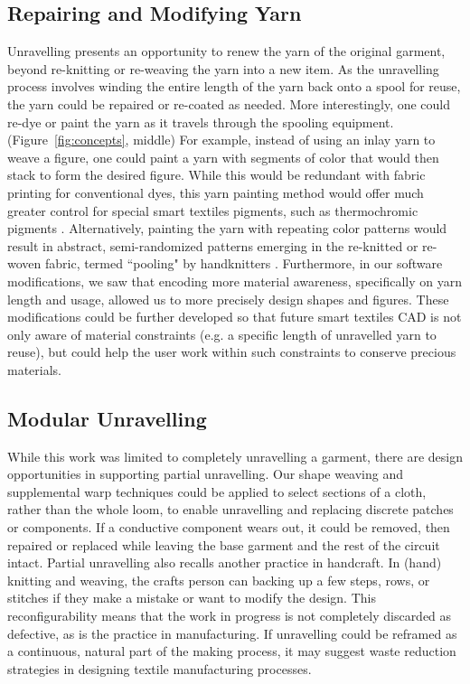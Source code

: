 \subsection{Repairing and Modifying Yarn}

Unravelling presents an opportunity to renew the yarn of the original garment, beyond re-knitting or re-weaving the yarn into a new item. As the unravelling process involves winding the entire length of the yarn back onto a spool for reuse, the yarn could be repaired or re-coated as needed. More interestingly, one could re-dye or paint the yarn as it travels through the spooling equipment. (Figure~\ref{fig:concepts}, middle) For example, instead of using an inlay yarn to weave a figure, one could paint a yarn with segments of color that would then stack to form the desired figure. While this would be redundant with fabric printing for conventional dyes, this yarn painting method would offer much greater control for special smart textiles pigments, such as thermochromic pigments \cite{devendorf_adapting_2019}. Alternatively, painting the yarn with repeating color patterns would result in abstract, semi-randomized patterns emerging in the re-knitted or re-woven fabric, termed ``pooling" by handknitters \cite{plannedpooling}. Furthermore, in our software modifications, we saw that encoding more material awareness, specifically on yarn length and usage, allowed us to more precisely design shapes and figures. These modifications could be further developed so that future smart textiles CAD is not only aware of material constraints (e.g. a specific length of unravelled yarn to reuse), but could help the user work within such constraints to conserve precious materials.


\subsection{Modular Unravelling}
While this work was limited to completely unravelling a garment, there are design opportunities in supporting partial unravelling. Our shape weaving and supplemental warp techniques could be applied to select sections of a cloth, rather than the whole loom, to enable unravelling and replacing discrete patches or components. If a conductive component wears out, it could be removed, then repaired or replaced while leaving the base garment and the rest of the circuit intact. %
Partial unravelling also recalls another practice in handcraft. In (hand) knitting and weaving, the crafts person can backing up a few steps, rows, or stitches if they make a mistake or want to modify the design. This reconfigurability means that the work in progress is not completely discarded as defective, as is the practice in manufacturing. If unravelling could be reframed as a continuous, natural part of the making process, it may suggest waste reduction strategies in designing textile manufacturing processes.

